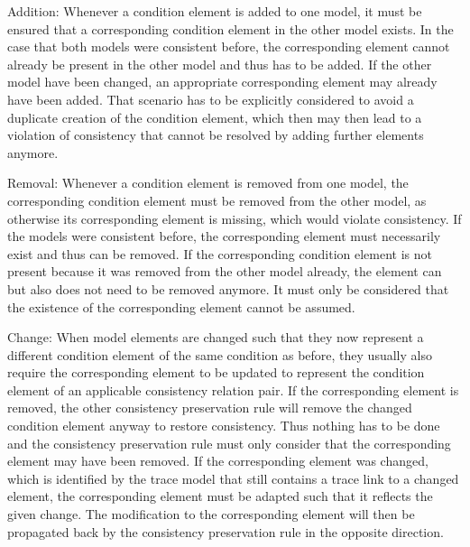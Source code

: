\begin{properdescription}
    \item[Addition:] Whenever a condition element is added to one model, it must be ensured that a corresponding condition element in the other model exists.
    In the case that both models were consistent before, the corresponding element cannot already be present in the other model and thus has to be added.
    If the other model have been changed, an appropriate corresponding element may already have been added.
    That scenario has to be explicitly considered to avoid a duplicate creation of the condition element, which then may then lead to a violation of consistency that cannot be resolved by adding further elements anymore.
    \item[Removal:] Whenever a condition element is removed from one model, the corresponding condition element must be removed from the other model, as otherwise its corresponding element is missing, which would violate consistency.
    If the models were consistent before, the corresponding element must necessarily exist and thus can be removed.
    If the corresponding condition element is not present because it was removed from the other model already, the element can but also does not need to be removed anymore.
    It must only be considered that the existence of the corresponding element cannot be assumed.
    \item[Change:] When model elements are changed such that they now represent a different condition element of the same condition as before, they usually also require the corresponding element to be updated to represent the condition element of an applicable consistency relation pair.
    If the corresponding element is removed, the other consistency preservation rule will remove the changed condition element anyway to restore consistency.
    Thus nothing has to be done and the consistency preservation rule must only consider that the corresponding element may have been removed.
    If the corresponding element was changed, which is identified by the trace model that still contains a trace link to a changed element, the corresponding element must be adapted such that it reflects the given change.
    The modification to the corresponding element will then be propagated back by the consistency preservation rule in the opposite direction.
\end{properdescription}

